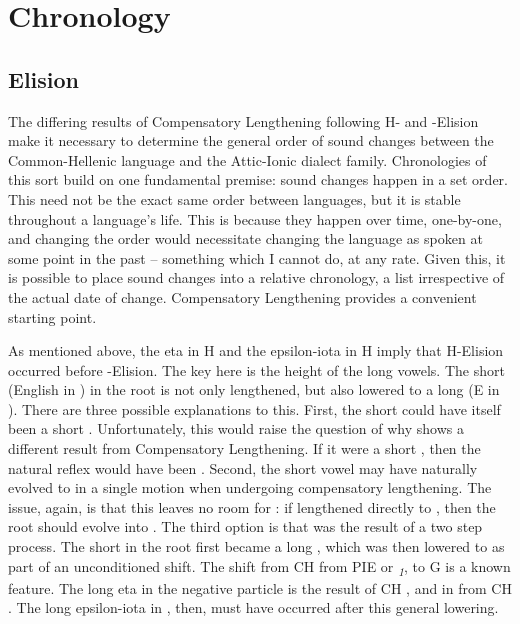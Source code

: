 \section{Chronology}\label{sec:Chrono}

\subsection{Elision}

The differing results of Compensatory Lengthening following H- and \W-Elision make it necessary to determine the general order of sound changes between the Common-Hellenic language and the Attic-Ionic dialect family. Chronologies of this sort build on one fundamental premise: sound changes happen in a set order. This need not be the exact same order between languages, but it is stable throughout a language's life. This is because they happen over time, one-by-one, and changing the order would necessitate changing the language as spoken at some point in the past -- something which I cannot do, at any rate. Given this, it is possible to place sound changes into a relative chronology, a list irrespective of the actual date of change. Compensatory Lengthening provides a convenient starting point.

As mentioned above, the eta  in H  and the epsilon-iota  in H  imply that H-Elision occurred before \W-Elision. The key here is the height of the long vowels. The short  (English  in ) in the root  is not only lengthened, but also lowered to a long  (E  in ). There are three possible explanations to this. First, the short  could have itself been a short . Unfortunately, this would raise the question of why  shows a different result from Compensatory Lengthening. If it were a short , then the natural reflex would have been . Second, the short vowel  may have naturally evolved to  in a single motion when undergoing compensatory lengthening. The issue, again, is that this leaves no room for : if  lengthened directly to , then the root  should evolve into . The third option is that  was the result of a two step process. The short  in the root  first became a long , which was then lowered to  as part of an unconditioned shift. The shift from CH  from PIE  or \textit{\textsubscript{1}}, to G  is a known feature. The long eta  in the negative particle  is the result of CH , and in  from CH .\autocite[51]{Smyth_2013} The long epsilon-iota in , then, must have occurred after this general lowering. 

